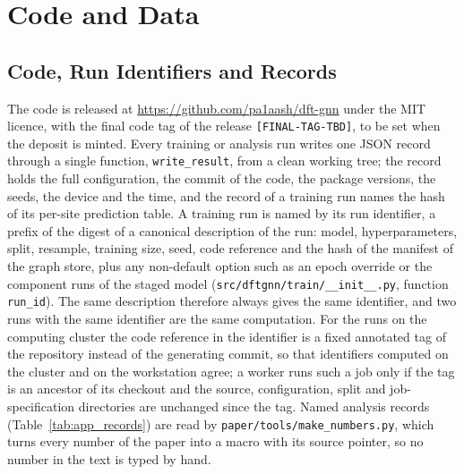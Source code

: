 \section{Code and Data}
\label{app:code}

\subsection{Code, Run Identifiers and Records}

The code is released at \url{https://github.com/pa1aash/dft-gnn} under the MIT licence, with the final code tag of the release \texttt{[FINAL-TAG-TBD]}, to be set when the deposit is minted. Every training or analysis run writes one JSON record through a single function, \texttt{write\_result}, from a clean working tree; the record holds the full configuration, the commit of the code, the package versions, the seeds, the device and the time, and the record of a training run names the hash of its per-site prediction table. A training run is named by its run identifier, a prefix of the \shatwo{} digest of a canonical description of the run: model, hyperparameters, split, resample, training size, seed, code reference and the hash of the manifest of the graph store, plus any non-default option such as an epoch override or the component runs of the staged model (\texttt{src/dftgnn/train/\_\_init\_\_.py}, function \texttt{run\_id}). The same description therefore always gives the same identifier, and two runs with the same identifier are the same computation. For the runs on the computing cluster the code reference in the identifier is a fixed annotated tag of the repository instead of the generating commit, so that identifiers computed on the cluster and on the workstation agree; a worker runs such a job only if the tag is an ancestor of its checkout and the source, configuration, split and job-specification directories are unchanged since the tag. Named analysis records (Table~\ref{tab:app_records}) are read by \texttt{paper/tools/make\_numbers.py}, which turns every number of the paper into a macro with its source pointer, so no number in the text is typed by hand.

